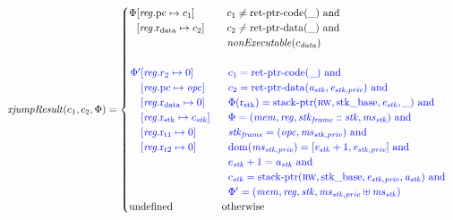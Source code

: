 \documentclass[a4paper]{article}
\begin{document}
\begin{align*}
  \xjumpResult{c_1}{c_2}{\Phi} = 
  \begin{cases}
    \arraycolsep=0pt
    \begin{array}[t]{rl}
      \Phi & \updReg{\pcreg}{c_1}\\
           & \updReg{\rdata}{c_2}
    \end{array} &
    \begin{array}[t]{l}
      c_1 \neq \retptrc(\_) \tand \\
      c_2 \neq \retptrd(\_) \tand \\
      \nonExec{c_\data}
    \end{array}
    \\&\\
    \sourcecolor\left.
      \arraycolsep=0pt
      \begin{array}[t]{rl}
        \Phi' & \updReg{r_2}{0} \\
              & \updReg{\pcreg}{\opc}\\
              & \updReg{\rdata}{0}\\
              & \updReg{\rstk}{c_\stk}\\
              & \updReg{\rtmp{1}}{0}\\
              & \updReg{\rtmp{2}}{0}
      \end{array}\right.&
    \sourcecolor\left.
      \begin{array}[t]{l}
        c_1 = \retptrc(\_) \tand \\
        c_2 = \retptrd(\aaddr_\stk,\eaddr_{\stk,\priv}) \tand \\
        \Phi(\rstk) = \stkptr{\rw,\stkb,\eaddr_\stk,\_} \tand \\ 
        \Phi = (\mem,\reg,\stkf::\stk,\ms_\stk) \tand \\
        \stkf = (\opc,\ms_{\stk,\priv}) \tand \\
        \dom(\ms_{\stk,\priv}) = [\eaddr_\stk+1,\eaddr_{\stk,\priv}] \tand\\
        e_\stk + 1 = a_\stk \tand\\
        c_\stk = \stkptr{\rw,\stkb,\eaddr_{\stk,\priv},\aaddr_\stk} \tand\\
        \Phi' = (\mem,\reg,\stk,\ms_{\stk,\priv} \uplus \ms_\stk) 
      \end{array}\right.
    \\
    \tundefined & \totherwise
  \end{cases}
\end{align*}
\end{document}
